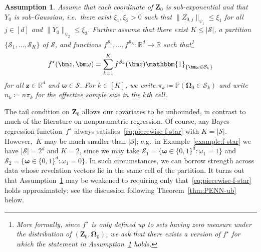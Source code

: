 \documentclass[12pt]{article}
\newtheorem{assumption}{Assumption}
\begin{document}
\begin{assumption} \label{assumption:piecewise-assumption}
    Assume that each coordinate of $\bm Z_0$ is sub-exponential and that $Y_0$ is sub-Gaussian, i.e.~there exist $\xi_1,\xi_2>0$ such that $\|Z_{0,j}\|_{\psi_1} \leq \xi_1$ for all $j\in[d]$ and $\|Y_0\|_{\psi_2} \leq \xi_2$. Further assume that there exist $K\leq |\mathcal{S}|$, a partition $\{\mathcal{S}_1,\ldots,\mathcal{S}_K\}$ of $\mathcal{S}$, and functions $f^{\mathcal{S}_1},\ldots,f^{\mathcal{S}_K} : \mathbb{R}^d \to \mathbb{R}$ such that\footnote{More formally, since $f^\star$ is only defined up to sets having zero measure under the distribution of $(\bm{Z}_0,\bm{\Omega}_0)$, we ask that there exists a version of $f^\star$ for which the statement in Assumption~\ref{assumption:piecewise-assumption} holds.}
    \begin{align}
        f^{\star}(\bm z, \bm\omega) = \sum_{k=1}^K f^{\mathcal{S}_k}(\bm z) \mathbbm{1}_{\{\bm\omega \in \mathcal{S}_k\}} \label{eq:piecewise-f-star}
    \end{align}
    for all $\bm z \in \mathbb{R}^d$ and $\bm\omega \in \mathcal{S}$.  For $k \in [K]$, we write $\pi_k \coloneqq \mathbb{P}(\bm \Omega_0 \in \mathcal{S}_k)$ and write $n_k \coloneqq n\pi_k$ for the \emph{effective sample size} in the $k$th cell. 
\end{assumption}
The tail condition on $\bm Z_0$ allows our covariates to be unbounded, in contrast to much of the literature on nonparametric regression.  Of course, any Bayes regression function~$f^{\star}$ always satisfies~\eqref{eq:piecewise-f-star} with $K = |\mathcal{S}|$. However,~$K$ may be much smaller than $|\mathcal{S}|$; e.g.~in Example~\ref{example:f-star} we have $|\mathcal{S}| = 2^d$ and $K=2$, since we may take $\mathcal{S}_1 = \bigl\{\bm{\omega} \in \{0,1\}^d:\omega_1 = 1\bigr\}$ and $\mathcal{S}_2 = \bigl\{\bm{\omega} \in \{0,1\}^d:\omega_1 = 0\bigr\}$.  In such circumstances, we can borrow strength across data whose revelation vectors lie in the same cell of the partition.  It turns out that Assumption~\ref{assumption:piecewise-assumption} may be weakened to requiring only that~\eqref{eq:piecewise-f-star} holds approximately; see the discussion following Theorem~\ref{thm:PENN-ub} below. 
\end{document}

